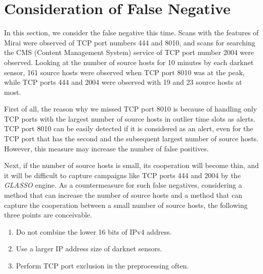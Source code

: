 \documentclass[conference]{IEEEtran}
\begin{document}

\section{Consideration of False Negative}
In this section, we consider the false negative this time.
Scans with the features of Mirai were observed of TCP port numbers 444 and 8010, and scans for searching the CMS (Content Management System) service of TCP port number 2004 were observed.
Looking at the number of source hosts for 10 minutes by each darknet sensor, 161 source hosts were observed when TCP port 8010 was at the peak, while TCP ports 444 and 2004 were observed with 19 and 23 source hosts at most.


First of all, the reason why we missed TCP port 8010 is because of handling only TCP ports with the largest number of source hosts in outlier time slots as alerts.
TCP port 8010 can be easily detected if it is considered as an alert, even for the TCP port that has the second and the subsequent largest number of source hosts.
However, this measure may increase the number of false positives.



Next, if the number of source hosts is small, its cooperation will become thin, and it will be difficult to capture campaigns like TCP ports 444 and 2004 by the {\it GLASSO} engine.
As a countermeasure for such false negatives, considering a method that can increase the number of source hosts and a method that can capture the cooperation between a small number of source hosts, the following three points are conceivable.
\begin{enumerate}
  \item Do not combine the lower 16 bits of IPv4 address.
  \item Use a larger IP address size of darknet sensors.
  \item Perform TCP port exclusion in the preprocessing often.
\end{enumerate}


\end{document}
